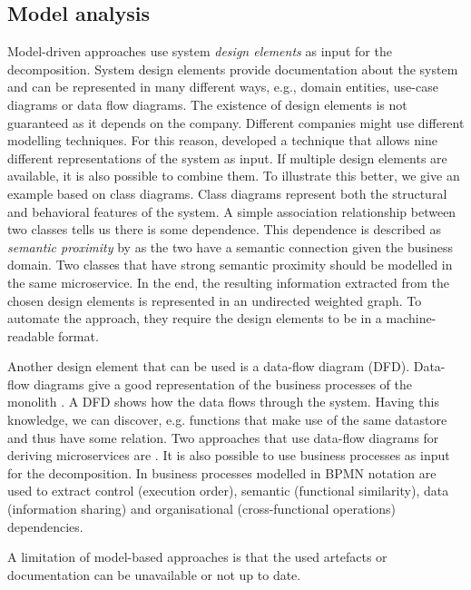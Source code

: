 \subsection{Model analysis}
Model-driven approaches use system \textit{design elements} as input for the decomposition. System design elements provide documentation about the system and can be represented in many different ways, e.g., domain entities, use-case diagrams or data flow diagrams. The existence of design elements is not guaranteed as it depends on the company. Different companies might use different modelling techniques. For this reason, \citeauthor{gysel2016service} \cite{gysel2016service} developed a technique that allows nine different representations of the system as input. If multiple design elements are available, it is also possible to combine them. To illustrate this better, we give an example based on class diagrams. Class diagrams represent both the structural and behavioral  features of the system. A simple association relationship between two classes tells us there is some dependence. This dependence is described as \textit{semantic proximity} by \cite{gysel2016service} as the two have a semantic connection given the business domain. Two classes that have  strong semantic proximity should be modelled in the same microservice. In the end, the resulting information extracted from the chosen design elements is represented in an undirected weighted graph. To automate the approach, they require the design elements to be in a machine-readable format. \par 
Another design element that can be used is a data-flow diagram (DFD). Data-flow diagrams give a good representation of the business processes of the monolith \cite{chen2017monolith}. A DFD shows how the data flows through the system. Having this knowledge, we can discover, e.g. functions that make use of the same datastore and thus have some relation. Two approaches that use data-flow diagrams for deriving microservices are \cite{chen2017monolith, selmadji2020monolithic}. It is also possible to use business processes as input for the decomposition. In \cite{daoud2020towards} business processes modelled in BPMN notation are used to extract control (execution order), semantic (functional similarity), data (information sharing) and organisational (cross-functional operations) dependencies. \par 
A limitation of model-based approaches is that the used artefacts or documentation can be unavailable or not up to date.

